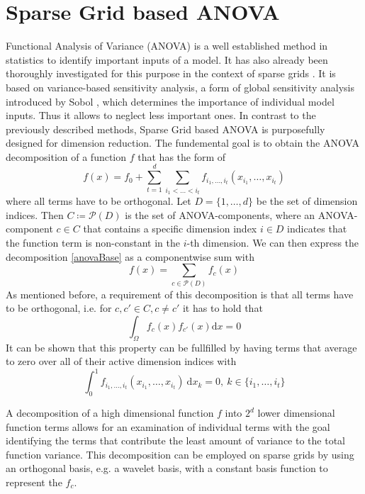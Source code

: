 \documentclass[
  a4paper,  %
  twoside,  %
  bibliography=totoc,
  headsepline,
  cleardoublepage=empty,
  parskip=half,
  draft=false
]{scrbook}
\begin{document}
\section{Sparse Grid based ANOVA}

Functional Analysis of Variance (ANOVA)  is a well established method in statistics to identify important inputs of a model.
It has also already been thoroughly investigated for this purpose in the context of sparse grids \cite{F10}.
It is based on variance-based sensitivity analysis, a form of global sensitivity analysis introduced by Sobol \cite{S01}, which determines the importance of individual model inputs.
Thus it allows to neglect less important ones.
In contrast to the previously described methods, Sparse Grid based ANOVA is purposefully designed for dimension reduction.
The fundemental goal is to obtain the ANOVA decomposition of a function $f$ that has the form of
\begin{equation}
f(x)=f_0 + \sum_{t=1}^d \sum_{i_1 < \dots < i_t} f_{i_1,\dots,i_t}(x_{i_1},\dots,x_{i_t})
\label{anovaBase}
\end{equation}
where all terms have to be orthogonal.
Let $D=\{1,\dots,d\}$ be the set of dimension indices.
Then $C \coloneqq \mathcal{P}(D)$ is the set of ANOVA-components, where an ANOVA-component $c \in C$ that contains a specific dimension index $i \in D$ indicates that the function term is non-constant in the $i$-th dimension.
We can then express the decomposition \eqref{anovaBase} as a componentwise sum with
\begin{equation}
f(x)=\sum_{c \in \mathcal{P}(D)} f_{c}(x)
\label{anovaComp}
\end{equation}
As mentioned before, a requirement of this decomposition is that all terms have to be orthogonal, i.e. for $c,c' \in C, c \neq c'$ it has to hold that
\begin{equation}
\int_{\Omega} f_c(x) f_{c'}(x) \text{d}x = 0
\label{eq:ortho}
\end{equation}
It can be shown that this property can be fullfilled by having terms that average to zero over all of their active dimension indices with
\begin{equation}
\int_0^1 f_{i_1,\dots,i_t}(x_{i_1},\dots,x_{i_t}) ~ \text{d}x_k = 0, ~ k \in \{i_1, \dots, i_t\}
\end{equation}



A decomposition of a high dimensional function $f$ into $2^d$ lower dimensional function terms allows for an examination of individual terms with the goal identifying the terms that contribute the least amount of variance to the total function variance.
This decomposition can be employed on sparse grids by using an orthogonal basis, e.g. a wavelet basis, with a constant basis function to represent the $f_c$.
\end{document}
